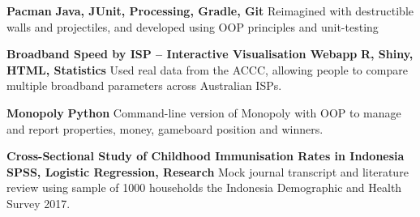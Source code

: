 \textbf{Pacman} \hfill \textbf{Java, JUnit, Processing, Gradle, Git}
\break{}
Reimagined with destructible walls and projectiles, and developed using OOP principles and unit-testing
\vspace{0.5em}

\textbf{Broadband Speed by ISP -- Interactive Visualisation Webapp}	\hfill \textbf{R, Shiny, HTML, Statistics}
\break{}
Used real data from the ACCC, allowing people to compare multiple broadband parameters across Australian ISPs.
\vspace{0.5em}

\textbf{Monopoly} \hfill \textbf{Python}
\break{}
Command-line version of Monopoly with OOP to manage and report properties, money, gameboard position and winners.
\vspace{0.5em}

\textbf{Cross-Sectional Study of Childhood Immunisation Rates in Indonesia} \hfill \textbf{SPSS, Logistic Regression, Research}
\break{}
Mock journal transcript and literature review using sample of 1000 households the Indonesia Demographic and Health Survey 2017.
